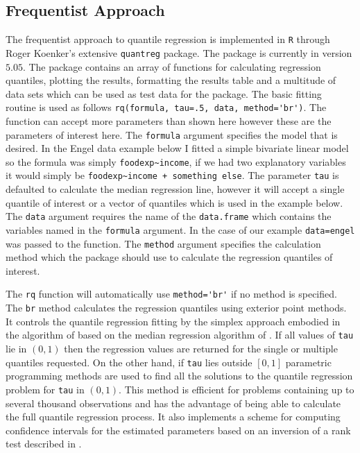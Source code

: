 \documentclass[12pt,a4paper]{report}
\begin{document}
\subsection{Frequentist Approach}
The frequentist approach to quantile regression is implemented in {\small\verb"R"} through Roger Koenker's extensive {\small\verb"quantreg"} package. The package is currently in version $5.05$. The package contains an array of functions for calculating regression quantiles, plotting the results, formatting the results table and a multitude of data sets which can be used as test data for the package. The basic fitting routine is used as follows {\small\verb"rq(formula, tau=.5, data, method='br')"}. The function can accept more parameters than shown here however these are the parameters of interest here. The {\small\verb"formula"} argument specifies the model that is desired. In the Engel data example below I fitted a simple bivariate linear model so the formula was simply {\small\verb"foodexp~income"}, if we had two explanatory variables it would simply be {\small\verb"foodexp~income + something else"}. The parameter {\small\verb"tau"} is defaulted to calculate the median regression line, however it will accept a single quantile of interest or a vector of quantiles which is used in the example below. The {\small\verb"data"} argument requires the name of the {\small\verb"data.frame"} which contains the variables named in the {\small\verb"formula"} argument. In the case of our example {\small\verb"data=engel"} was passed to the function. The {\small\verb"method"} argument specifies the calculation method which the package should use to calculate the regression quantiles of interest.
\vspace{2mm}

The {\small\verb"rq"} function will automatically use {\small\verb"method='br'"} if no method is specified. The {\small\verb"br"} method calculates the regression quantiles using exterior point methods. It controls the quantile regression fitting by the simplex approach embodied in the algorithm of \citet{KdO1987} based on the median regression algorithm of \citet{BR1974}. If all values of {\small\verb"tau"} lie in $(0,1)$ then the regression values are returned for the single or multiple quantiles requested. On the other hand, if {\small\verb"tau"} lies outside $[0,1]$ parametric programming methods are used to find all the solutions to the quantile regression problem for {\small\verb"tau"} in $(0,1)$. This method is efficient for problems containing up to several thousand observations and has the advantage of being able to calculate the full quantile regression process. It also implements a scheme for computing confidence intervals for the estimated parameters based on an inversion of a rank test described in \citet{RK1994}.
\vspace{2mm}
\end{document}
